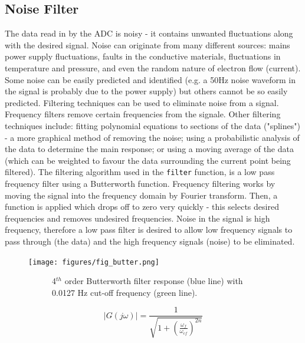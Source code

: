 \documentclass[twoside,a4]{report}
\def\br{\newline \newline \noindent}
\begin{document}
	\subsection*{Noise Filter}
	The data read in by the ADC is noisy - it contains unwanted fluctuations along with the desired signal. Noise can originate from many different sources: mains power supply fluctuations, faults in the conductive materials, fluctuations in temperature and pressure, and even the random nature of electron flow (current)\cite{wileyadvsignproc}. Some noise can be easily predicted and identified (e.g. a 50Hz noise waveform in the signal is probably due to the power supply) but others cannot be so easily predicted. 
	\br
	Filtering techniques can be used to eliminate noise from a signal. Frequency filters remove certain frequencies from the signale. Other filtering techniques include: fitting polynomial equations to sections of the data ("splines") - a more graphical method of removing the noise; using a probabilistic analysis of the data to determine the main response; or using a moving average of the data (which can be weighted to favour the data surrounding the current point being filtered).
	\br
	The filtering algorithm used in the \texttt{filter} function, is a low pass frequency filter using a Butterworth function. Frequency filtering works by moving the signal into the frequency domain by Fourier transform. Then, a function is applied which drops off to zero very quickly - this selects desired frequencies and removes undesired frequencies. Noise in the signal is high frequency, therefore a low pass filter is desired to allow low frequency signals to pass through (the data) and the high frequency signals (noise) to be eliminated.
	
	\begin{figure}[!htb]
		\centering
		\texttt{[image: figures/fig\_butter.png]}
		\caption{Frequency Domain Signal Response To Butterworth Function}
		\label{figbutter}
		\begin{subfigure}{0.8\textwidth}
			\centering
			{\footnotesize 4$^{th}$ order Butterworth filter response (blue line) with 0.0127 Hz cut-off frequency (green line).}
		\end{subfigure}
	\end{figure}
	
	\begin{equation}
		|G(j\omega)| = \frac{1}{\sqrt{1 + \left(\frac{\omega_f}{\omega_{cf}}\right)^{2n}}}
		\label{eqnbuttgain}
	\end{equation}
	
\end{document}
